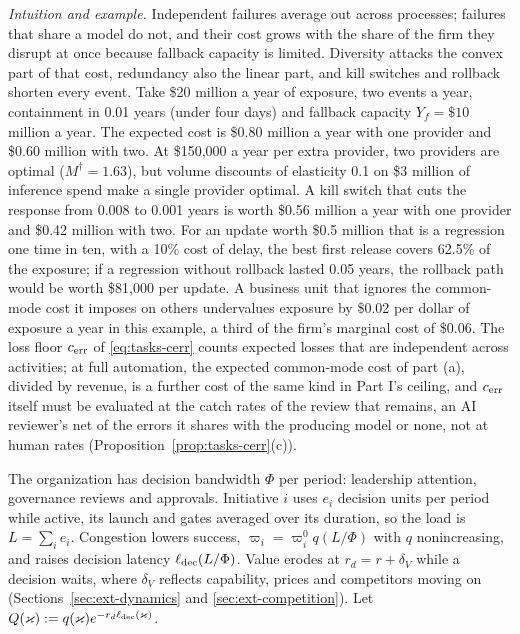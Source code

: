 \noindent\emph{Intuition and example.} Independent failures average out across processes; failures that share a model do not, and their cost grows with the share of the firm they disrupt at once because fallback capacity is limited. Diversity attacks the convex part of that cost, redundancy also the linear part, and kill switches and rollback shorten every event. Take \$20 million a year of exposure, two events a year, containment in 0.01 years (under four days) and fallback capacity $Y_f=\$10$ million a year. The expected cost is \$0.80 million a year with one provider and \$0.60 million with two. At \$150{,}000 a year per extra provider, two providers are optimal ($M^\dagger=1.63$), but volume discounts of elasticity 0.1 on \$3 million of inference spend make a single provider optimal. A kill switch that cuts the response from 0.008 to 0.001 years is worth \$0.56 million a year with one provider and \$0.42 million with two. For an update worth \$0.5 million that is a regression one time in ten, with a 10\% cost of delay, the best first release covers 62.5\% of the exposure; if a regression without rollback lasted 0.05 years, the rollback path would be worth \$81{,}000 per update. A business unit that ignores the common-mode cost it imposes on others undervalues exposure by \$0.02 per dollar of exposure a year in this example, a third of the firm's marginal cost of \$0.06. The loss floor $c_{\rm err}$ of \eqref{eq:tasks-cerr} counts expected losses that are independent across activities; at full automation, the expected common-mode cost of part (a), divided by revenue, is a further cost of the same kind in Part I's ceiling, and $c_{\rm err}$ itself must be evaluated at the catch rates of the review that remains, an AI reviewer's net of the errors it shares with the producing model or none, not at human rates (Proposition~\ref{prop:tasks-cerr}(c)).

\begin{assumption}\label{ass:ext-bandwidth}
The organization has decision bandwidth $\Phi$ per period: leadership attention, governance reviews and approvals. Initiative $i$ uses $e_i$ decision units per period while active, its launch and gates averaged over its duration, so the load is $L=\sum_ie_i$. Congestion lowers success, $\varpi_i=\varpi^0_iq(L/\Phi)$ with $q$ nonincreasing, and raises decision latency $\ell_{\rm dec}(L/\Phi)$. Value erodes at $r_d=r+\delta_V$ while a decision waits, where $\delta_V$ reflects capability, prices and competitors moving on (Sections~\ref{sec:ext-dynamics} and \ref{sec:ext-competition}). Let $Q(\varkappa):=q(\varkappa)e^{-r_d\ell_{\rm dec}(\varkappa)}$.
\end{assumption}

